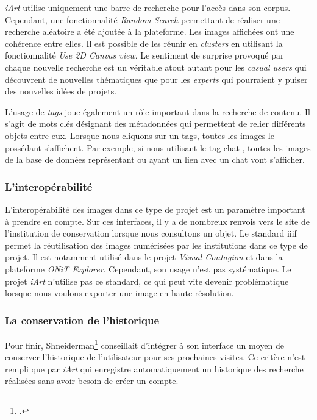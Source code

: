 \textit{iArt} utilise uniquement une barre de recherche pour l'accès dans son corpus. Cependant, une fonctionnalité \textit{Random Search} permettant de réaliser une recherche aléatoire a été ajoutée à la plateforme. Les images affichées ont une cohérence entre elles. Il est possible de les réunir en \textit{clusters} en utilisant la fonctionnalité \textit{Use 2D Canvas view}. Le sentiment de surprise provoqué par chaque nouvelle recherche est un véritable atout autant pour les \textit{casual users} qui découvrent de nouvelles thématiques que pour les \textit{experts} qui pourraient y puiser des nouvelles idées de projets.

L'usage de \textit{tags} joue également un rôle important dans la recherche de contenu. Il s'agit de mots clés désignant des métadonnées qui permettent de relier différents objets entre-eux. Lorsque nous cliquons sur un tags, toutes les images le possédant s'affichent. Par exemple, si nous utilisant le tag \og chat \fg, toutes les images de la base de données représentant ou ayant un lien avec un chat vont s'afficher.  


\subsubsection{L'interopérabilité}

L'interopérabilité des images dans ce type de projet est un paramètre important à prendre en compte. Sur ces interfaces, il y a de nombreux renvois vers le site de l'institution de conservation lorsque nous consultons un objet. Le standard \gls{iiif} permet la réutilisation des images numérisées par les institutions dans ce type de projet. Il est notamment utilisé dans le projet \textit{Visual Contagion} et dans la plateforme \textit{ONiT Explorer}. Cependant, son usage n'est pas systématique. Le projet \textit{iArt} n'utilise pas ce standard, ce qui peut vite devenir problématique lorsque nous voulons exporter une image en haute résolution.

\subsubsection{La conservation de l'historique}

Pour finir, Shneiderman\footcite{shneidermanEyesHaveIt} conseillait d'intégrer à son interface un moyen de conserver l'historique de l'utilisateur pour ses prochaines visites. Ce critère n'est rempli que par \textit{iArt} qui enregistre automatiquement un historique des recherche réalisées sans avoir besoin de créer un compte. 
